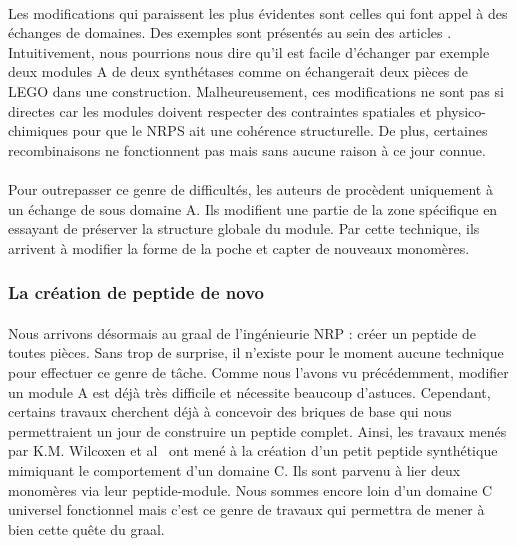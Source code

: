 \documentclass[12pt,french,twoside]{report}
\begin{document}
\paragraph{}Les modifications qui paraissent les plus évidentes sont celles qui font appel à des échanges de domaines.
Des exemples sont présentés au sein des articles \cite{cane_harnessing_1998,kim_reinvigorating_2015}.
Intuitivement, nous pourrions nous dire qu'il est facile d'échanger par exemple deux modules A de deux synthétases comme on échangerait deux pièces de LEGO dans une construction.
Malheureusement, ces modifications ne sont pas si directes car les modules doivent respecter des contraintes spatiales et physico-chimiques pour que le NRPS ait une cohérence structurelle.
De plus, certaines recombinaisons ne fonctionnent pas mais sans aucune raison à ce jour connue.


\paragraph{}Pour outrepasser ce genre de difficultés, les auteurs de \cite{kries_subdomain_2015} procèdent uniquement à un échange de sous domaine A.
Ils modifient une partie de la zone spécifique en essayant de préserver la structure globale du module.
Par cette technique, ils arrivent à modifier la forme de la poche et capter de nouveaux monomères.


\subsubsection{La création de peptide de novo}

\paragraph{}Nous arrivons désormais au graal de l'ingénieurie NRP : créer un peptide de toutes pièces.
Sans trop de surprise, il n'existe pour le moment aucune technique pour effectuer ce genre de tâche.
Comme nous l'avons vu précédemment, modifier un module A est déjà très difficile et nécessite beaucoup d'astuces.
Cependant, certains travaux cherchent déjà à concevoir des briques de base qui nous permettraient un jour de construire un peptide complet.
Ainsi, les travaux menés par K.M. Wilcoxen et al~\cite{wilcoxen_biomimetic_2007} ont mené à la création d'un petit peptide synthétique mimiquant le comportement d'un domaine C.
Ils sont parvenu à lier deux monomères via leur peptide-module.
Nous sommes encore loin d'un domaine C universel fonctionnel mais c'est ce genre de travaux qui permettra de mener à bien cette quête du graal.
\end{document}
